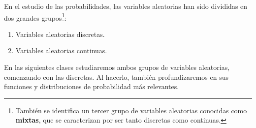 \documentclass[12pt]{article}
\begin{document}
En el estudio de las probabilidades, las variables aleatorias han sido divididas en dos grandes grupos\footnote{También se identifica un tercer grupo de variables aleatorias conocidas como \textbf{mixtas}, que se caracterizan por ser tanto discretas como continuas.}:

\begin{enumerate}
\item Variables aleatorias discretas.
\item Variables aleatorias continuas.
\end{enumerate}

En las siguientes clases estudiaremos ambos grupos de variables aleatorias, comenzando con las discretas. Al hacerlo, también profundizaremos en sus funciones y distribuciones de probabilidad más relevantes.
\end{document}
